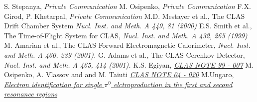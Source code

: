 \begin{thebibliography}{mybib}
     {S. Stepanya},              {\it Private Communication}
       {M. Osipenko},              {\it Private Communication}
     {F.X. Girod, P. Khetarpal}, {\it Private Communication}
           {M.D. Mestayer et al.}, The CLAS Drift Chamber System                 {\it Nucl. Inst. and Meth. A 449, 81 (2000)}
         {E.S. Smith et al.},    The Time-of-Flight System for CLAS,           {\it Nucl. Inst. and Meth. A 432, 265 (1999)}
           {M. Amarian et al.},    The CLAS Forward Electromagnetic Calorimeter, {\it Nucl. Inst. and Meth. A 460, 239 (2001).}
           {G. Adams et al.},      The CLAS Cerenkov Detector,                   {\it Nucl. Inst. and Meth. A 465, 414 (2001).}
        {K.S. Egiyan},                               \href{http://www.jlab.org/Hall-B/notes/clas_notes99/ec_thresh.ps}          {\it CLAS NOTE 99 - 007}
                       {M. Osipenko, A. Vlassov and and M. Taiuti } \href{http://www1.jlab.org/ul/Physics/Hall-B/clas/public/2004-020.pdf}     {\it CLAS NOTE 04 - 020}
     {M.Ungaro},                                  \href{https://maureeungaro.github.io/home/meson/pi0_resonance/electron_id} {\it Electron identification for single $\pi^0$ elctroproduction in the first and second resonance regions}
\end{thebibliography}
